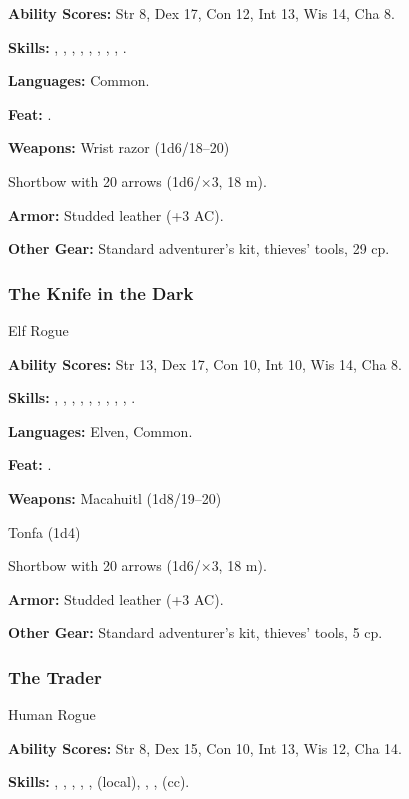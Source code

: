 \textbf{Ability Scores:} Str 8, Dex 17, Con 12, Int 13, Wis 14, Cha 8.

\textbf{Skills:} , , , , , , , , .

\textbf{Languages:} Common.

\textbf{Feat:} .

\textbf{Weapons:} Wrist razor (1d6/18--20)

Shortbow with 20 arrows (1d6/$\times$3, 18 m).

\textbf{Armor:} Studded leather (+3 AC).

\textbf{Other Gear:} Standard adventurer's kit, thieves' tools, 29 cp.

\subsubsection{The Knife in the Dark}
Elf Rogue

\textbf{Ability Scores:} Str 13, Dex 17, Con 10, Int 10, Wis 14, Cha 8.

\textbf{Skills:} , , , , , , , , , .

\textbf{Languages:} Elven, Common.

\textbf{Feat:} .

\textbf{Weapons:} Macahuitl (1d8/19--20)

Tonfa (1d4)

Shortbow with 20 arrows (1d6/$\times$3, 18 m).

\textbf{Armor:} Studded leather (+3 AC).

\textbf{Other Gear:} Standard adventurer's kit, thieves' tools, 5 cp.

\subsubsection{The Trader}
Human Rogue

\textbf{Ability Scores:} Str 8, Dex 15, Con 10, Int 13, Wis 12, Cha 14.

\textbf{Skills:} , , , , ,  (local), , ,  (cc).

